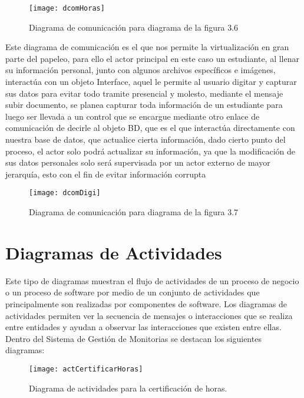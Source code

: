 \begin{figure}[H]
	\centering
	\texttt{[image: dcomHoras]}
    \centering
    \caption{Diagrama de comunicación para diagrama de la figura 3.6}
	\label{fig:dcomHoras}
\end{figure}
\clearpage
Este diagrama de comunicación es el que nos permite la virtualización en gran parte del papeleo, para ello el actor principal en este caso un estudiante, al llenar su información personal, junto con algunos archivos específicos e imágenes, interactúa con un objeto Interface, aquel le permite al usuario digitar y capturar sus datos para evitar todo tramite presencial y molesto, mediante el mensaje subir documento, se planea capturar toda información de un estudiante para luego ser llevada a un control que se encargue mediante otro enlace de comunicación de decirle al objeto BD, que es el que interactúa directamente con nuestra base de datos, que actualice cierta información, dado cierto punto del proceso, el actor solo podrá actualizar su información, ya que la modificación de sus datos personales solo será supervisada por un actor externo de mayor jerarquía, esto con el fin de evitar información corrupta
\begin{figure}[H]
	\centering
	\texttt{[image: dcomDigi]}
    \centering
    \caption{Diagrama de comunicación para diagrama de la figura 3.7}
	\label{fig:dcomDigi}
\end{figure}
\clearpage

\newpage


\section{Diagramas de Actividades}
Este tipo de diagramas muestran el flujo de actividades de un proceso de negocio o un proceso de software por medio de un conjunto de actividades que principalmente son realizadas por componentes de software. Los diagramas de actividades permiten ver la secuencia de mensajes o interacciones que se realiza entre entidades y ayudan a observar las interacciones que existen entre ellas.
Dentro del Sistema de Gestión de Monitorias se destacan los siguientes diagramas:

\begin{figure}[H]
	\centering
	\texttt{[image: actCertificarHoras]}
	\centering
	\caption{Diagrama de actividades para la certificación de horas.}
	\label{fig:actCertificarHoras}
\end{figure}

